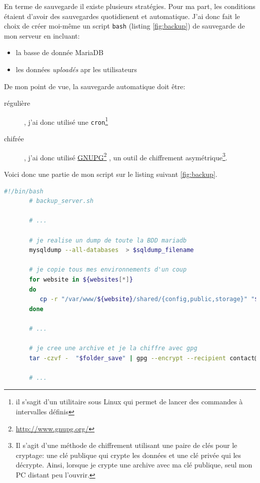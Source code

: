 \documentclass[]{report}
\newcommand\fnurl[2]{%
  \href{#1}{#2}\footnote{\url{#1}}%
}
\begin{document}
    En terme de sauvegarde il existe plusieurs stratégies. Pour ma part, les conditions étaient d'avoir des sauvegardes quotidienent et automatique. J'ai donc fait le choix de créer moi-même un script \verb|bash| (listing \ref{fig:backup}) de sauvegarde de mon serveur en incluant:

    \begin{itemize}
      \item la basse de donnée MariaDB
      \item les données \textit{uploadés} apr les utilisateurs
    \end{itemize}

    De mon point de vue, la sauvegarde automatique doit être:

    \begin{description}
      \item[régulière], j'ai donc utilisé une \verb|cron|\footnote{il s'sagit d'un utilitaire sous Linux qui permet de lancer des commandes à intervalles définis}
      \item[chifrée], j'ai donc utilisé \fnurl{http://www.gnupg.org/}{GNUPG}, un outil de chiffrement asymétrique\footnote{Il s'agit d'une méthode de chiffrement utilisant une paire de clés pour le cryptage: une clé publique qui crypte les données et une clé privée qui les décrypte. Ainsi, lorsque je crypte une archive avec ma clé publique, seul mon PC distant peu l'ouvrir.}.
    \end{description}

    Voici donc une partie de mon script sur le listing suivant \ref{fig:backup}.

     \begin{scriptsize}
       \begin{lstlisting}[language=bash, label={fig:backup}, caption={Script de sauvegarde automatique des données du serveur}]
       #!/bin/bash
       # backup_server.sh

       # ...

       # je realise un dump de toute la BDD mariadb
       mysqldump --all-databases  > $sqldump_filename

       # je copie tous mes environnements d'un coup
       for website in ${websites[*]}
       do
          cp -r "/var/www/${website}/shared/{config,public,storage}" "${website}/shared/"
       done

       # ...

       # je cree une archive et je la chiffre avec gpg
       tar -czvf -  "$folder_save" | gpg --encrypt --recipient contact@rousseau-alexandre.fr -o "$folder_save.tar.gz.gpg" --always-trust

       # ...
       \end{lstlisting}
     \end{scriptsize}
\end{document}
